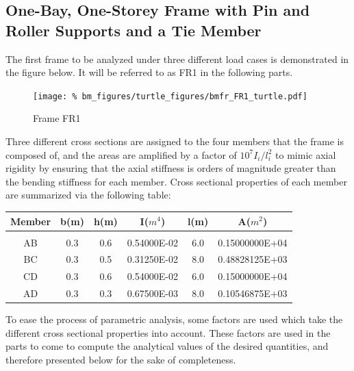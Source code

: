 \clearpage
%
%
\lstset{basicstyle=\ttfamily\scriptsize, columns=fullflexible, keepspaces=true}
%
%
\subsection{One-Bay, One-Storey Frame with Pin and Roller Supports and a Tie Member}
The first frame to be analyzed under three different load cases is demonstrated in the figure 
below. It will be referred to as FR1 in the following parts.
\begin{figure}[h]
    \texttt{[image: \%
                            bm\_figures/turtle\_figures/bmfr\_FR1\_turtle.pdf]}
    \centering
    \caption{Frame FR1}
    \label{fig:bmfr01_turtle}
\end{figure}
\par
Three different cross sections are assigned to the four members that the frame is composed of,
and the areas are amplified by a factor of $10^7 I_i/l_i^2$ to mimic axial rigidity by ensuring
that the axial stiffness is orders of magnitude greater than the bending stiffness for each
member. Cross sectional properties of each member are summarized via the following table:
\begin{table}[h!]
\centering
\begin{tabular}{ c c c c c c}
    Member & b(m) & h(m) & I($m^4$)    & l(m) & A($m^2$)       \\ \hline \\
    AB     & 0.3  & 0.6  & 0.54000E-02 & 6.0  & 0.15000000E+04 \\
    BC     & 0.3  & 0.5  & 0.31250E-02 & 8.0  & 0.48828125E+03 \\
    CD     & 0.3  & 0.6  & 0.54000E-02 & 6.0  & 0.15000000E+04 \\
    AD     & 0.3  & 0.3  & 0.67500E-03 & 8.0  & 0.10546875E+03 \\
\end{tabular}
\end{table}
\par
To ease the process of parametric analysis, some factors are used which take the different cross 
sectional properties into account. These factors are used in the parts to come to compute
the analytical values of the desired quantities, and therefore presented below for the sake of
completeness.
